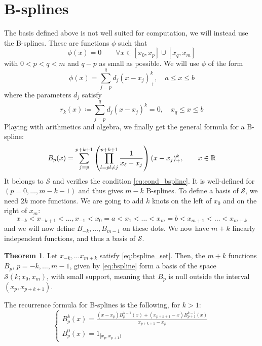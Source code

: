 \documentclass[12pt, openany]{report}
\theoremstyle{definition}
\newtheorem{thm}{Theorem}[chapter]
\newcommand{\R}{\mathbb{R}}
\begin{document}
\section{B-splines}
The basis defined above is not well suited for computation, we will instead use the B-splines. These are functions \(\phi\) such that 
\begin{equation}\label{eq:cond_bspline}
    \phi(x) = 0\qquad \forall x\in [x_0,x_p]\cup [x_q,x_m]
\end{equation}
with \(0<p<q<m\) and \(q-p\) as small as possible. We will use \(\phi\) of the form 
\begin{equation}
    \phi(x) = \sum_{j=p}^qd_j(x-x_j)^k_+, \quad a\le x \le b
\end{equation} 
where the parameters \(d_j\) satisfy
\begin{equation}
    r_k(x)\coloneqq \sum_{j=p}^qd_j(x-x_j)^k=0,\quad x_q\le x\le b
\end{equation}
Playing with arithmetics and algebra, we finally get the general formula for a B-spline:
\begin{equation}\label{eq:bspline}
    B_p(x) = \sum_{j=p}^{p+k+1}\left(\prod_{l=p\\ l\neq j}^{p+k+1}\frac{1}{x_\ell-x_j}\right)(x-x_j)^k_+,\qquad x\in \R
\end{equation}
It belongs to \(\mathcal{S}\) and verifies the condition \eqref{eq:cond_bspline}. It is well-defined for \((p=0,\dots,m-k-1)\) and thus gives \(m-k\) B-splines. To define a basis of \(\mathcal{S}\), we need \(2k\) more functions. We are going to add \(k\) knots on the left of \(x_0\) and on the right of \(x_m\):
\begin{equation}\label{eq:bspline_set}
    x_{-k}<x_{-k+1}<\dots,x_{-1}<x_0=a<x_1<\dots<x_{m}=b<x_{m+1}<\dots<x_{m+k}
\end{equation}
and we will now define \(B_{-k},\dots,B_{m-1}\) on these dots. We now have \(m+k\) linearly independent functions, and thus a basis of \(\mathcal{S}\). 
\begin{thm}
    Let \(x_{-k},\dots x_{m+k}\) satisfy \eqref{eq:bspline_set}. Then, the \(m+k\) functions \(B_p\), \(p=-k,\dots,m-1\), given by \eqref{eq:bspline} form a basis of the space \(\mathcal{S}(k;x_0,x_m)\), with small support, meaning that \(B_p\) is null outside the interval \((x_p,x_{p+k+1})\). 
\end{thm}
The recurrence formula for B-splines is the following, for \(k>1\):
\begin{equation}
    \begin{cases}
        B_p^k(x) = \frac{(x-x_p)B_p^{k-1}(x)+(x_{p+k+1}-x)B_{p+1}^{k-1}(x)}{x_{p+k+1}-x_p}\\
        B_p^0(x) = 1_{[x_p,x_{p+1})}
    \end{cases}
\end{equation}
\end{document}
